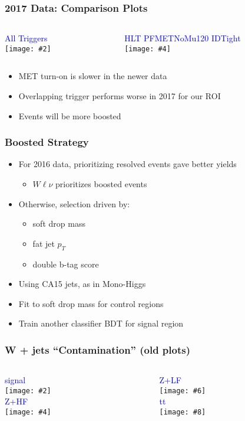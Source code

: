 \documentclass{beamer}
\newcommand{\twofigs}[4]{
  \begin{columns}
    \begin{column}{0.5\linewidth}
      \centering
      \textcolor{blue}{#1} \\
      \texttt{[image: \#2]}
    \end{column}
    \begin{column}{0.5\linewidth}
      \centering
      \textcolor{blue}{#3} \\
      \texttt{[image: \#4]}
    \end{column}
  \end{columns}
}
\newcommand{\fourfigs}[8]{
  \begin{columns}
    \begin{column}{0.3\linewidth}
      \centering
      \textcolor{blue}{#1} \\
      \texttt{[image: \#2]} \\
      \textcolor{blue}{#3} \\
      \texttt{[image: \#4]}
    \end{column}
    \begin{column}{0.3\linewidth}
      \centering
      \textcolor{blue}{#5} \\
      \texttt{[image: \#6]} \\
      \textcolor{blue}{#7} \\
      \texttt{[image: \#8]}
    \end{column}
  \end{columns}
}
\begin{document}
\begin{frame}
  \frametitle{2017 Data: Comparison Plots}

  \twofigs{All Triggers}
          {180515_fin/pfmet.pdf}
          {HLT PFMETNoMu120 IDTight}
          {180516_trig/pfmet.pdf}

  \vspace{12pt}

  \begin{itemize}
  \item MET turn-on is slower in the newer data
  \item Overlapping trigger performs worse in 2017 for our ROI
  \item Events will be more boosted
  \end{itemize}

\end{frame}

\begin{frame}
  \frametitle{Boosted Strategy}
  \begin{itemize}
  \item For 2016 data, prioritizing resolved events gave better yields
    \begin{itemize}
    \item $W\ell\nu$ prioritizes boosted events
    \end{itemize}
  \item Otherwise, selection driven by:
    \begin{itemize}
    \item soft drop mass
    \item fat jet $p_T$
    \item double b-tag score
    \end{itemize}
  \item Using CA15 jets, as in Mono-Higgs
  \item Fit to soft drop mass for control regions
  \item Train another classifier BDT for signal region
  \end{itemize}
\end{frame}

\begin{frame}
  \frametitle{W + jets ``Contamination'' (old plots)}
  \fourfigs{signal}
           {180328_v3/boosted_signal_fatjet1_mSD_corr}
           {Z+HF}
           {180328_v1/boosted_heavyz_fatjet1_mSD_corr}
           {Z+LF}
           {180327_v4/boosted_lightz_fatjet1_mSD_corr}
           {tt}
           {180327_v4/boosted_tt_fatjet1_mSD_corr}
\end{frame}
\end{document}
